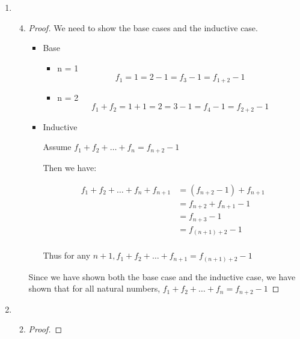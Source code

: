 \documentclass[12pt,letterpaper]{article}
\newcommand*\PCI{%
  Principle of Complete Induction%
}
\begin{document}
\begin{enumerate}
\begin{enumerate}
\begin{enumerate}
\begin{proof}
                Then by the \PCI,
                every natural number greater than 33 can be written as $4s + 5t$,
                for some $s, t \in \mathbb{N}$,
                with $s \geq 3, t \geq 2$.
              \end{proof}
          \end{enumerate}
        \setcounter{enumii}{4}
        \item
          \begin{enumerate}
            \setcounter{enumiii}{3}
            \item
              \begin{proof}
                We need to show the base cases and the inductive case.
                \begin{itemize}
                  \item Base
                    \begin{itemize}
                      \item n = 1
                        \[f_1 = 1 = 2 - 1 = f_3 - 1 = f_{1 + 2} - 1\]
                      \item n = 2
                        \[f_1 + f_2 = 1 + 1 = 2 = 3 - 1 = f_4 - 1 = f_{2 + 2} - 1\]
                    \end{itemize}
                  \item Inductive

                    Assume $f_1 + f_2 + \dots + f_n = f_{n + 2} - 1$

                    Then we have:

                    \begin{align*}
                      f_1 + f_2 + \dots + f_n + f_{n + 1}
                      &= \left(f_{n + 2} - 1\right) + f_{n + 1} \\
                      &= f_{n + 2} + f_{n + 1} - 1 \\
                      &= f_{n + 3} - 1 \\
                      &= f_{\left(n + 1\right) + 2} - 1 \\
                    \end{align*}

                    Thus for any $n + 1, f_1 + f_2 + \dots + f_{n + 1} = f_{\left(n + 1\right) + 2} - 1$
                \end{itemize}

                Since we have shown both the base case and the inductive case,
                we have shown that for all natural numbers,
                $f_1 + f_2 + \dots + f_n = f_{n + 2} - 1$
              \end{proof}
          \end{enumerate}
        \item
          \begin{enumerate}
            \setcounter{enumiii}{1}
            \item
              \begin{proof}


\end{proof}
\end{enumerate}
\end{enumerate}
\end{enumerate}
\end{document}
